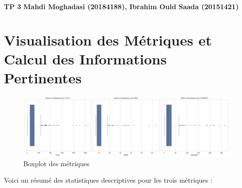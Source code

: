 \documentclass[10pt]{article}
\begin{document}
\noindent \textbf{TP 3} \hfill \textbf{Mahdi Moghadasi (20184188), Ibrahim Ould Saada (20151421)}


\section{Visualisation des Métriques et Calcul des Informations Pertinentes}

\begin{figure}[h]
\centering
\includegraphics[width=1\textwidth]{boxplot.png}
\caption{Boxplot des métriques}
\end{figure}

Voici un résumé des statistiques descriptives pour les trois métriques :

\begin{table}[h]
\centering
{}
\caption{Résumé des statistiques descriptives}
\end{table}
\end{document}
